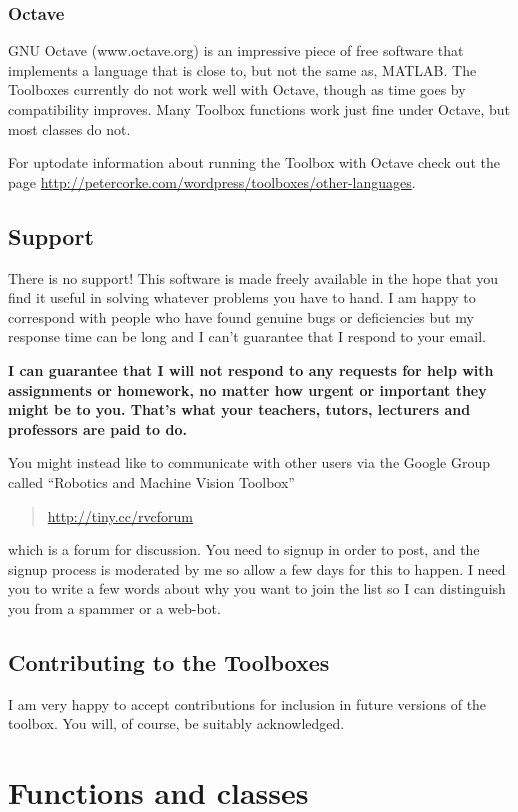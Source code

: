 \documentclass[a4paper,twoside]{report}
\makeatletter
\newcommand\funcsection{%
\@startsection{section}{1}{\z@}%
  {-3.5ex \@plus -1ex \@minus -.2ex}%
  {2.3ex \@plus.2ex}%
  {\color{red}\sffamily\huge\bfseries}}
\def\Mlab{MATLAB}
\makeatother
\begin{document}
\subsection{Octave}
GNU Octave (www.octave.org) is an impressive piece of free software that implements a language that is close to, but not the same as, \Mlab. The Toolboxes currently do not work well with Octave, though as time goes by compatibility improves.  
Many Toolbox functions work just fine under Octave, but most classes do not.

For uptodate information about running the Toolbox with Octave check out the page \url{http://petercorke.com/wordpress/toolboxes/other-languages}.



\section{Support}
There is no support!  This software is made freely available in the hope that you find it useful in solving whatever problems
you have to hand.
I am happy to correspond with people who have found genuine
bugs or deficiencies but my response time can be long and I can't guarantee that I respond to your email.

\textbf{I can guarantee that I will not respond to any requests for help with assignments or homework, no matter
how urgent or important they might be to you.  That's what your teachers, tutors, lecturers and professors are paid to do.}

You might instead like to communicate with other users via 
the Google Group called ``Robotics and Machine Vision Toolbox'' 
\begin{quote}
\url{http://tiny.cc/rvcforum}
\end{quote}
which is a forum for discussion.
You need to signup in order to post, and the signup process is moderated by me so allow a few
days for this to happen.  I need you to write a few words about why you want to join the list
so I can distinguish you from a spammer or a web-bot.



\section{Contributing to the Toolboxes}
I am very happy to accept contributions for inclusion in future versions of the
toolbox.  You will, of course, be suitably acknowledged.

\renewcommand{\section}{\funcsection}
\newpage
\chapter{Functions and classes}



\end{document}
